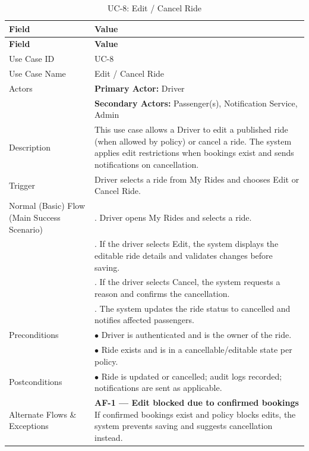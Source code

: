 \begin{longtable}{|>{\raggedright\arraybackslash}p{4cm}|>{\raggedright\arraybackslash}p{11cm}|}
\caption{UC-8: Edit / Cancel Ride}
\label{tab:uc-8} \\
\hline
\rowcolor{lightgray!30}
\textbf{Field} & \textbf{Value} \\
\hline
\endfirsthead
\hline
\rowcolor{lightgray!30}
\textbf{Field} & \textbf{Value} \\
\hline
\endhead
\hline
\endfoot
\hline
\endlastfoot
Use Case ID & UC-8 \\
\hline
Use Case Name & Edit / Cancel Ride \\
\hline
Actors & \textbf{Primary Actor:} Driver \\
& \textbf{Secondary Actors:} Passenger(s), Notification Service, Admin \\
\hline
Description & This use case allows a Driver to edit a published ride (when allowed by policy) or cancel a ride. The system applies edit restrictions when bookings exist and sends notifications on cancellation. \\
\hline
Trigger & Driver selects a ride from My Rides and chooses Edit or Cancel Ride. \\
\hline
Normal (Basic) Flow (Main Success Scenario) & 1. Driver opens My Rides and selects a ride. \\
& 2. If the driver selects Edit, the system displays the editable ride details and validates changes before saving. \\
& 3. If the driver selects Cancel, the system requests a reason and confirms the cancellation. \\
& 4. The system updates the ride status to cancelled and notifies affected passengers. \\
\hline
Preconditions & $\bullet$ Driver is authenticated and is the owner of the ride. \\
& $\bullet$ Ride exists and is in a cancellable/editable state per policy. \\
\hline
Postconditions & $\bullet$ Ride is updated or cancelled; audit logs recorded; notifications are sent as applicable. \\
\hline
Alternate Flows \& Exceptions & \textbf{AF-1 — Edit blocked due to confirmed bookings} \newline If confirmed bookings exist and policy blocks edits, the system prevents saving and suggests cancellation instead. \\

\end{longtable}

